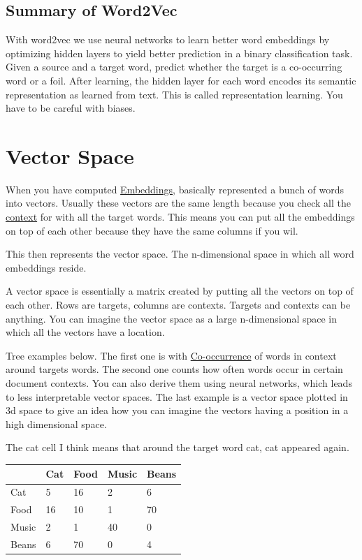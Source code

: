 \documentclass[
  11pt,
  british,
]{article}
\begin{document}
\hypertarget{summary-of-word2vec}{%
\subsection{Summary of Word2Vec}\label{summary-of-word2vec}}

With word2vec we use neural networks to learn better word embeddings by
optimizing hidden layers to yield better prediction in a binary
classification task. Given a source and a target word, predict whether
the target is a co-occurring word or a foil. After learning, the hidden
layer for each word encodes its semantic representation as learned from
text. This is called representation learning. You have to be careful
with biases.

\hypertarget{vector-space}{%
\section{Vector Space}\label{vector-space}}

When you have computed \href{Embeddings.md}{Embeddings}, basically
represented a bunch of words into vectors. Usually these vectors are the
same length because you check all the \href{Context.md}{context} for
with all the target words. This means you can put all the embeddings on
top of each other because they have the same columns if you wil.

This then represents the vector space. The n-dimensional space in which
all word embeddings reside.

A vector space is essentially a matrix created by putting all the
vectors on top of each other. Rows are targets, columns are contexts.
Targets and contexts can be anything. You can imagine the vector space
as a large n-dimensional space in which all the vectors have a location.

Tree examples below. The first one is with
\href{Co-occurrence.md}{Co-occurrence} of words in context around
targets words. The second one counts how often words occur in certain
document contexts. You can also derive them using neural networks, which
leads to less interpretable vector spaces. The last example is a vector
space plotted in 3d space to give an idea how you can imagine the
vectors having a position in a high dimensional space.

The cat cell I think means that around the target word cat, cat appeared
again.

\begin{longtable}[]{@{}lllll@{}}
\toprule
& Cat & Food & Music & Beans \\
\midrule
\endhead
Cat & 5 & 16 & 2 & 6 \\
Food & 16 & 10 & 1 & 70 \\
Music & 2 & 1 & 40 & 0 \\
Beans & 6 & 70 & 0 & 4 \\
\bottomrule
\end{longtable}
\end{document}
